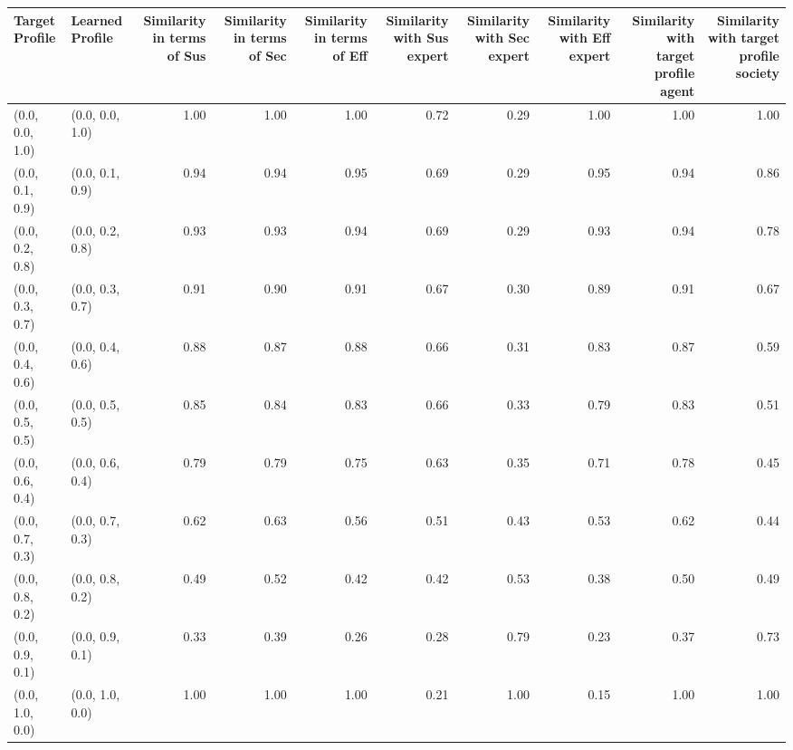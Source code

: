 \begin{tabular}{llrrrrrrrr}
\toprule
Target Profile & Learned Profile & Similarity in terms of Sus & Similarity in terms of Sec & Similarity in terms of Eff & Similarity with Sus expert & Similarity with Sec expert & Similarity with Eff expert & Similarity with target profile agent & Similarity with target profile society \\
\midrule
(0.0, 0.0, 1.0) & (0.0, 0.0, 1.0) & 1.00 & 1.00 & 1.00 & 0.72 & 0.29 & 1.00 & 1.00 & 1.00 \\
(0.0, 0.1, 0.9) & (0.0, 0.1, 0.9) & 0.94 & 0.94 & 0.95 & 0.69 & 0.29 & 0.95 & 0.94 & 0.86 \\
(0.0, 0.2, 0.8) & (0.0, 0.2, 0.8) & 0.93 & 0.93 & 0.94 & 0.69 & 0.29 & 0.93 & 0.94 & 0.78 \\
(0.0, 0.3, 0.7) & (0.0, 0.3, 0.7) & 0.91 & 0.90 & 0.91 & 0.67 & 0.30 & 0.89 & 0.91 & 0.67 \\
(0.0, 0.4, 0.6) & (0.0, 0.4, 0.6) & 0.88 & 0.87 & 0.88 & 0.66 & 0.31 & 0.83 & 0.87 & 0.59 \\
(0.0, 0.5, 0.5) & (0.0, 0.5, 0.5) & 0.85 & 0.84 & 0.83 & 0.66 & 0.33 & 0.79 & 0.83 & 0.51 \\
(0.0, 0.6, 0.4) & (0.0, 0.6, 0.4) & 0.79 & 0.79 & 0.75 & 0.63 & 0.35 & 0.71 & 0.78 & 0.45 \\
(0.0, 0.7, 0.3) & (0.0, 0.7, 0.3) & 0.62 & 0.63 & 0.56 & 0.51 & 0.43 & 0.53 & 0.62 & 0.44 \\
(0.0, 0.8, 0.2) & (0.0, 0.8, 0.2) & 0.49 & 0.52 & 0.42 & 0.42 & 0.53 & 0.38 & 0.50 & 0.49 \\
(0.0, 0.9, 0.1) & (0.0, 0.9, 0.1) & 0.33 & 0.39 & 0.26 & 0.28 & 0.79 & 0.23 & 0.37 & 0.73 \\
(0.0, 1.0, 0.0) & (0.0, 1.0, 0.0) & 1.00 & 1.00 & 1.00 & 0.21 & 1.00 & 0.15 & 1.00 & 1.00 \\
\bottomrule
\end{tabular}
